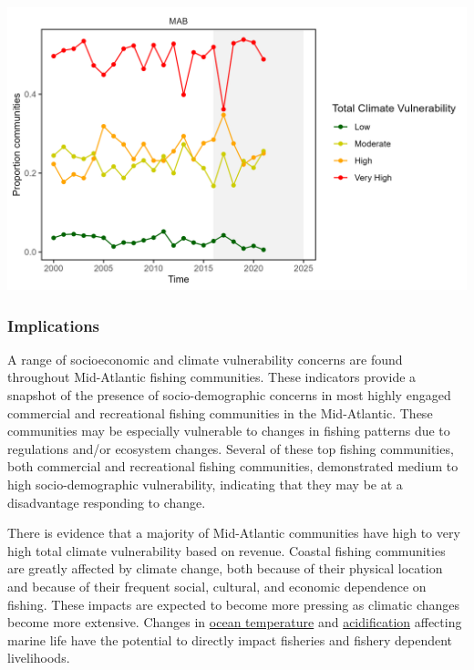 \documentclass[
  10pt,
]{article}
\let\origfigure\figure
\let\endorigfigure\endfigure
\renewenvironment{figure}[1][2] {
    \expandafter\origfigure\expandafter[H]
} {
    \endorigfigure
}
\begin{document}
\begin{figure}

{\centering \includegraphics[width=6.5in]{images/MidAtlantic/commvulex_MidAtlantic_2025-09-05} 

}

\caption{Proportion of Mid-Atlantic communities at each revenue climate vulnerability level over time.}\label{fig:commvulex}
\end{figure}

\subsubsection{Implications}\label{implications-4}

A range of socioeconomic and climate vulnerability concerns are found throughout Mid-Atlantic fishing communities. These indicators provide a snapshot of the presence of socio-demographic concerns in most highly engaged commercial and recreational fishing communities in the Mid-Atlantic. These communities may be especially vulnerable to changes in fishing patterns due to regulations and/or ecosystem changes. Several of these top fishing communities, both commercial and recreational fishing communities, demonstrated medium to high socio-demographic vulnerability, indicating that they may be at a disadvantage responding to change.

There is evidence that a majority of Mid-Atlantic communities have high to very high total climate vulnerability based on revenue. Coastal fishing communities are greatly affected by climate change, both because of their physical location and because of their frequent social, cultural, and economic dependence on fishing. These impacts are expected to become more pressing as climatic changes become more extensive. Changes in \href{https://noaa-edab.github.io/catalog/bottom_temp_insitu.html}{ocean temperature} and \href{https://noaa-edab.github.io/catalog/ocean_acidification.html}{acidification} affecting marine life have the potential to directly impact fisheries and fishery dependent livelihoods.
\end{document}
